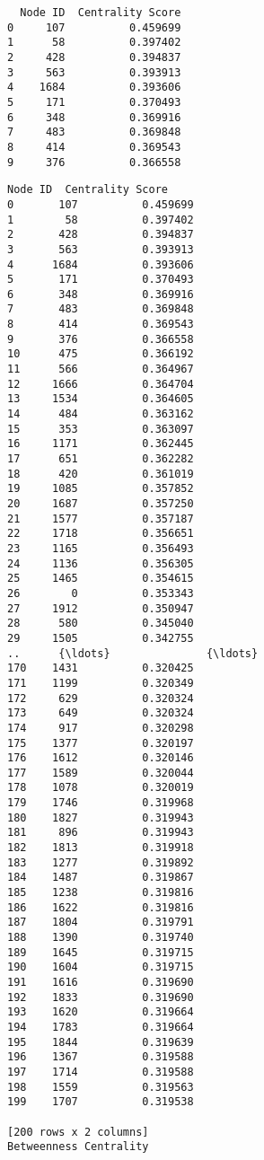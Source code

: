 \documentclass[11pt]{article}
\begin{document}
    
    \begin{verbatim}
  Node ID  Centrality Score
0     107          0.459699
1      58          0.397402
2     428          0.394837
3     563          0.393913
4    1684          0.393606
5     171          0.370493
6     348          0.369916
7     483          0.369848
8     414          0.369543
9     376          0.366558
    \end{verbatim}

    
    \begin{Verbatim}[commandchars=\\\{\}]
    Node ID  Centrality Score
0       107          0.459699
1        58          0.397402
2       428          0.394837
3       563          0.393913
4      1684          0.393606
5       171          0.370493
6       348          0.369916
7       483          0.369848
8       414          0.369543
9       376          0.366558
10      475          0.366192
11      566          0.364967
12     1666          0.364704
13     1534          0.364605
14      484          0.363162
15      353          0.363097
16     1171          0.362445
17      651          0.362282
18      420          0.361019
19     1085          0.357852
20     1687          0.357250
21     1577          0.357187
22     1718          0.356651
23     1165          0.356493
24     1136          0.356305
25     1465          0.354615
26        0          0.353343
27     1912          0.350947
28      580          0.345040
29     1505          0.342755
..      {\ldots}               {\ldots}
170    1431          0.320425
171    1199          0.320349
172     629          0.320324
173     649          0.320324
174     917          0.320298
175    1377          0.320197
176    1612          0.320146
177    1589          0.320044
178    1078          0.320019
179    1746          0.319968
180    1827          0.319943
181     896          0.319943
182    1813          0.319918
183    1277          0.319892
184    1487          0.319867
185    1238          0.319816
186    1622          0.319816
187    1804          0.319791
188    1390          0.319740
189    1645          0.319715
190    1604          0.319715
191    1616          0.319690
192    1833          0.319690
193    1620          0.319664
194    1783          0.319664
195    1844          0.319639
196    1367          0.319588
197    1714          0.319588
198    1559          0.319563
199    1707          0.319538

[200 rows x 2 columns]
Betweenness Centrality

    \end{Verbatim}
\end{document}
